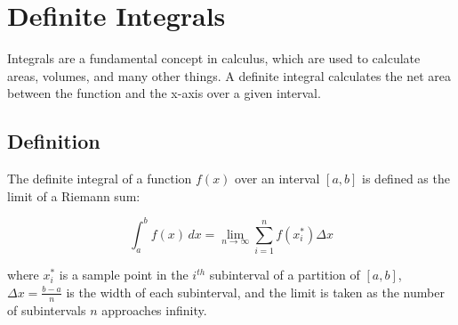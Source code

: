 \chapter{Definite Integrals}

Integrals are a fundamental concept in calculus, which are used to
calculate areas, volumes, and many other things. A definite integral
calculates the net area between the function and the x-axis over a
given interval.

\section{Definition}

The definite integral of a function $f(x)$ over an interval $[a, b]$
is defined as the limit of a Riemann sum:

\begin{equation}
\int_{a}^{b} f(x) \, dx = \lim_{{n \to \infty}} \sum_{i=1}^{n} f(x_i^*) \Delta x
\end{equation}

where $x_i^*$ is a sample point in the $i^{th}$ subinterval of a
partition of $[a, b]$, $\Delta x = \frac{b-a}{n}$ is the width of each
subinterval, and the limit is taken as the number of subintervals $n$
approaches infinity.

